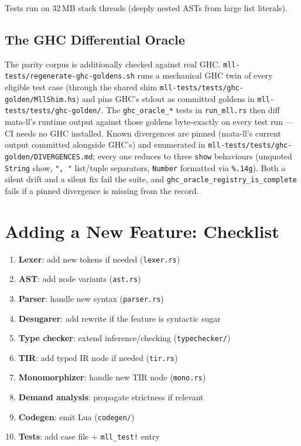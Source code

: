 \documentclass[11pt,a4paper]{article}
\begin{document}
Tests run on 32\,MB stack threads (deeply nested ASTs from large list literals).

\subsection{The GHC Differential Oracle}

The parity corpus is additionally checked against real GHC.
\texttt{mll-tests/regenerate-ghc-goldens.sh} runs a mechanical GHC twin
of every eligible test case (through the shared shim
\texttt{mll-tests/tests/ghc-golden/MllShim.hs}) and pins GHC's stdout as
committed goldens in \texttt{mll-tests/tests/ghc-golden/}.  The
\texttt{ghc\_oracle\_*} tests in \texttt{run\_mll.rs} then diff
mata-ll's runtime output against those goldens byte-exactly on every
test run --- CI needs no GHC installed.  Known divergences are pinned
(mata-ll's current output committed alongside GHC's) and enumerated in
\texttt{mll-tests/tests/ghc-golden/DIVERGENCES.md}; every one reduces
to three \texttt{show} behaviours (unquoted \texttt{String} show,
\texttt{", "} list/tuple separators, \texttt{Number} formatted via
\texttt{\%.14g}).  Both a silent drift and a silent fix fail the suite,
and \texttt{ghc\_oracle\_registry\_is\_complete} fails if a pinned
divergence is missing from the record.

\section{Adding a New Feature: Checklist}

\begin{enumerate}[nosep]
  \item \textbf{Lexer}: add new tokens if needed (\texttt{lexer.rs})
  \item \textbf{AST}: add node variants (\texttt{ast.rs})
  \item \textbf{Parser}: handle new syntax (\texttt{parser.rs})
  \item \textbf{Desugarer}: add rewrite if the feature is syntactic sugar
  \item \textbf{Type checker}: extend inference/checking (\texttt{typechecker/})
  \item \textbf{TIR}: add typed IR node if needed (\texttt{tir.rs})
  \item \textbf{Monomorphizer}: handle new TIR node (\texttt{mono.rs})
  \item \textbf{Demand analysis}: propagate strictness if relevant
  \item \textbf{Codegen}: emit Lua (\texttt{codegen/})
  \item \textbf{Tests}: add case file + \texttt{mll\_test!} entry
\end{enumerate}
\end{document}
